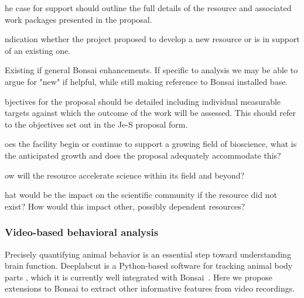 \documentclass[a4paper,11point]{article}
\def\ii#1\par{{\color{blue!40}\sl #1}\par}
\def\iitem#1\par{\ii\begin{itemize}[nosep]\item #1 \end{itemize}\par}
\begin{document}
\ii The case for support should outline the full details of the resource and 
associated work packages presented in the proposal.

\iitem Indication whether the project proposed to develop a new
resource or is in support of an existing one.

Existing if general Bonsai enhancements.  If specific to analysis we
may be able to argue for "new" if helpful, while still making
reference to Bonsai installed base.  

\iitem Objectives for the proposal should be detailed including
individual measurable targets against which the outcome of the work
will be assessed. This should refer to the objectives set out in the
Je-S proposal form.

\iitem{Significant technical details for the development, maintenance or 
enhancement of the resource must be clearly outlined and indicated 
how this is of internationally exceptional quality. }

\iitem{If applicable, outline any proposed research efforts and how they 
  directly facilitate development of the resource. }

\iitem{For proposals looking to focus on maintaining status quo for an 
existing resource instead of suggesting further development, you 
should detail evidence of why significant upgrades are not required at 
this time and detail why the resource needs continued support to 
maintain world-leading functionality.}

\ii{Additional questions that may be considered: }

\iitem Does the facility begin or continue to support a growing field of 
bioscience, what is the anticipated growth and does the proposal 
adequately accommodate this? 

\iitem How will the resource accelerate science within its field and
  beyond?

\iitem What would be the impact on the scientific community if the resource 
did not exist? How would this impact other, possibly dependent 
resources?

\subsubsection{Video-based behavioral analysis}
\label{sec:videoBasedBehavioralAnalysis}

Precisely quantifying animal behavior is an essential step toward understanding
brain function.  Deeplabcut is a Python-based software for tracking animal body
parts \citep{mathisEtAl18}, which it is currently well integrated with
Bonsai~\citep{kaneEtAl20}. Here we propose extensions to Bonsai to extract
other informative features from video recordings.
\end{document}
